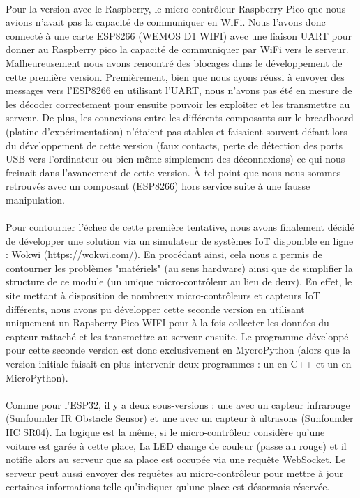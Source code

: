 \paragraph*{}
Pour la version avec le Raspberry, le micro-contrôleur Raspberry Pico que nous avions n'avait pas la capacité de communiquer en WiFi. Nous l'avons donc connecté à une carte ESP8266 (WEMOS D1 WIFI) avec une liaison UART pour donner au Raspberry pico la capacité de communiquer par WiFi vers le serveur. 
Malheureusement nous avons rencontré des blocages dans le développement de cette première version. Premièrement, bien que nous ayons réussi à envoyer des messages vers l'ESP8266 en utilisant l'UART, nous n'avons pas été en mesure de les décoder correctement pour ensuite pouvoir les exploiter et les transmettre au serveur.
De plus, les connexions entre les différents composants sur le breadboard (platine d'expérimentation) n'étaient pas stables et faisaient souvent défaut lors du développement de cette version (faux contacts, perte de détection des ports USB vers l'ordinateur ou bien  même simplement des déconnexions) ce qui nous freinait dans l'avancement de cette version. À tel point que nous nous sommes retrouvés avec un composant (ESP8266) hors service suite à une fausse manipulation. 


\paragraph*{}
Pour contourner l'échec de cette première tentative, nous avons finalement décidé de développer une solution via un simulateur de systèmes IoT disponible en ligne : Wokwi (\url{https://wokwi.com/}). En procédant ainsi, cela nous a permis de contourner les problèmes "matériels" (au sens hardware) ainsi que de simplifier la structure de ce module (un unique micro-contrôleur au lieu de deux). En effet, le site mettant à disposition de nombreux micro-contrôleurs et capteurs IoT différents, nous avons pu développer cette seconde version en utilisant uniquement un Rapsberry Pico WIFI pour à la fois collecter les données du capteur rattaché et les transmettre au serveur ensuite. Le programme développé pour cette seconde version est donc exclusivement en MycroPython (alors que la version initiale faisait en plus intervenir deux programmes : un en C++ et un en MicroPython).

\paragraph*{}
Comme pour l'ESP32, il y a deux sous-versions : une avec un capteur infrarouge (Sunfounder IR Obstacle Sensor) et une avec un capteur à ultrasons (Sunfounder HC SR04). La logique est la même, si le micro-contrôleur considère qu'une voiture est garée à cette place, La LED change de couleur (passe au rouge) et il notifie alors au serveur que sa place est occupée via une requête WebSocket. Le serveur peut aussi envoyer des requêtes au micro-contrôleur pour mettre à jour certaines informations telle qu'indiquer qu'une place est désormais réservée.


